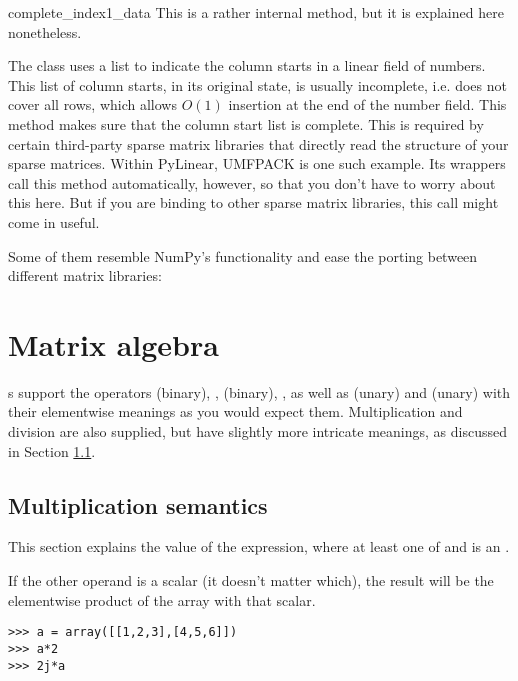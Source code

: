 \begin{methoddesc}[SparseExecuteMatrix]{complete_index1_data}{}
  This is a rather internal method, but it is explained here
  nonetheless.

  The  class uses a list to indicate the
  column starts in a linear field of numbers. This list of column
  starts, in its original state, is usually incomplete, i.e. does not
  cover all rows, which allows $O(1)$ insertion at the end of the
  number field. This method makes sure that the column start list is
  complete. This is required by certain third-party sparse matrix
  libraries that directly read the structure of your sparse
  matrices. Within PyLinear, UMFPACK is one such example. Its wrappers
  call this method automatically, however, so that you don't have to
  worry about this here. But if you are binding to other sparse matrix
  libraries, this call might come in useful.
\end{methoddesc}

Some of them resemble NumPy's functionality and ease the porting between
different matrix libraries:

\section{Matrix algebra}
s support the operators \code{+} (binary), \code{+=},
\code{-} (binary), \code{-=}, as well as \code{+} (unary) and \code{-}
(unary) with their elementwise meanings as you would expect them.
Multiplication and division are also supplied, but have slightly more
intricate meanings, as discussed in Section
\ref{subsec:arraymultiplication}.



\subsection{Multiplication semantics}
\label{subsec:arraymultiplication}

This section explains the value of the expression, where at
least one of  and  is an .

If the other operand is a scalar (it doesn't matter which), the
result will be the elementwise product of the array with that scalar.
\begin{verbatim}
>>> a = array([[1,2,3],[4,5,6]])
>>> a*2
>>> 2j*a
\end{verbatim}

